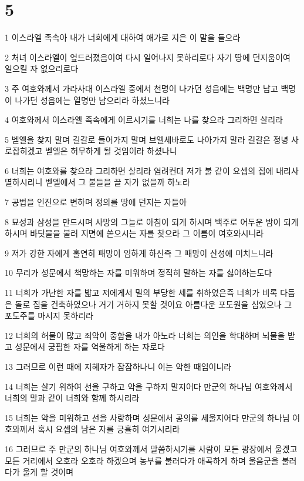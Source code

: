 \chapter{5}

\par 1 이스라엘 족속아 내가 너희에게 대하여 애가로 지은 이 말을 들으라
\par 2 처녀 이스라엘이 엎드러졌음이여 다시 일어나지 못하리로다 자기 땅에 던지움이여 일으킬 자 없으리로다
\par 3 주 여호와께서 가라사대 이스라엘 중에서 천명이 나가던 성읍에는 백명만 남고 백명이 나가던 성읍에는 열명만 남으리라 하셨느니라
\par 4 여호와께서 이스라엘 족속에게 이르시기를 너희는 나를 찾으라 그리하면 살리라
\par 5 벧엘을 찾지 말며 길갈로 들어가지 말며 브엘세바로도 나아가지 말라 길갈은 정녕 사로잡히겠고 벧엘은 허무하게 될 것임이라 하셨나니
\par 6 너희는 여호와를 찾으라 그리하면 살리라 염려컨대 저가 불 같이 요셉의 집에 내리사 멸하시리니 벧엘에서 그 불들을 끌 자가 없을까 하노라
\par 7 공법을 인진으로 변하며 정의를 땅에 던지는 자들아
\par 8 묘성과 삼성을 만드시며 사망의 그늘로 아침이 되게 하시며 백주로 어두운 밤이 되게 하시며 바닷물을 불러 지면에 쏟으시는 자를 찾으라 그 이름이 여호와시니라
\par 9 저가 강한 자에게 홀연히 패망이 임하게 하신즉 그 패망이 산성에 미치느니라
\par 10 무리가 성문에서 책망하는 자를 미워하며 정직히 말하는 자를 싫어하는도다
\par 11 너희가 가난한 자를 밟고 저에게서 밀의 부당한 세를 취하였은즉 너희가 비록 다듬은 돌로 집을 건축하였으나 거기 거하지 못할 것이요 아름다운 포도원을 심었으나 그 포도주를 마시지 못하리라
\par 12 너희의 허물이 많고 죄악이 중함을 내가 아노라 너희는 의인을 학대하며 뇌물을 받고 성문에서 궁핍한 자를 억울하게 하는 자로다
\par 13 그러므로 이런 때에 지혜자가 잠잠하나니 이는 악한 때임이니라
\par 14 너희는 살기 위하여 선을 구하고 악을 구하지 말지어다 만군의 하나님 여호와께서 너희의 말과 같이 너희와 함께 하시리라
\par 15 너희는 악을 미워하고 선을 사랑하며 성문에서 공의를 세울지어다 만군의 하나님 여호와께서 혹시 요셉의 남은 자를 긍휼히 여기시리라
\par 16 그러므로 주 만군의 하나님 여호와께서 말씀하시기를 사람이 모든 광장에서 울겠고 모든 거리에서 오호라 오호라 하겠으며 농부를 불러다가 애곡하게 하며 울음군을 불러다가 울게 할 것이며

